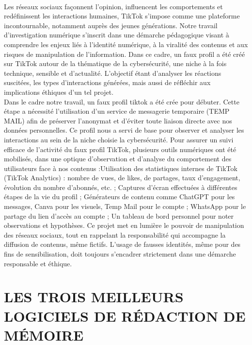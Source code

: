 \documentclass[]{article}
\begin{document}
\paragraph{}
Les réseaux sociaux façonnent l’opinion, influencent les comportements et redéfinissent les interactions humaines, TikTok s’impose comme une plateforme incontournable, notamment auprès des jeunes générations. Notre travail d’investigation numérique s’inscrit dans une démarche pédagogique visant à comprendre les enjeux liés à l’identité numérique, à la viralité des contenus et aux risques de manipulation de l’information. Dans ce cadre, un faux profil a été créé sur TikTok autour de la thématique de la cybersécurité, une niche à la fois technique, sensible et d’actualité. L’objectif étant d’analyser les réactions suscitées, les types d’interactions générées, mais aussi de réfléchir aux implications éthiques d’un tel projet.\\
Dans le cadre notre travail, un faux profil tiktok a été crée pour débuter. Cette étape a nécessité l’utilisation d’un service de messagerie temporaire (TEMP MAIL) afin de préserver l’anonymat et d’éviter toute liaison directe avec nos données personnelles. Ce profil nous a servi de base pour observer et analyser les interactions au sein de la niche choisie la cybersécurité. Pour assurer un suivi efficace de l’activité du faux profil TikTok, plusieurs outils numériques ont été mobilisés, dans une optique d’observation et d’analyse du comportement des utilisateurs face à nos contenus :Utilisation des statistiques internes de TikTok (TikTok Analytics) : nombre de vues, de likes, de partages, taux d’engagement, évolution du nombre d’abonnés, etc. ; Captures d’écran effectuées à différentes étapes de la vie du profil ; Générateurs de contenu comme ChatGPT pour les messages, Canva pour les visuels, Temp Mail pour le compte ; WhatsApp pour le partage du lien d’accès au compte ; Un tableau de bord personnel pour noter observations et hypothèses. Ce projet met en lumière le pouvoir de manipulation des réseaux sociaux, tout en rappelant la responsabilité qui accompagne la diffusion de contenus, même fictifs. L’usage de fausses identités, même pour des fins de sensibilisation, doit toujours s’encadrer strictement dans une démarche responsable et éthique.

\section{LES TROIS MEILLEURS LOGICIELS DE RÉDACTION DE MÉMOIRE}
\end{document}

